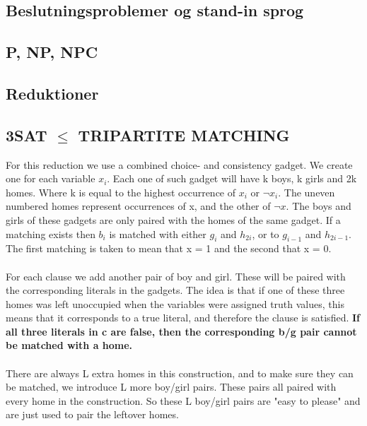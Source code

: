 \subsection{Beslutningsproblemer og stand-in sprog}
\subsection{P, NP, NPC}
\subsection{Reduktioner}
\subsection{3SAT $\le$ TRIPARTITE MATCHING}
For this reduction we use a combined choice- and consistency gadget. We create one for each variable $x_i$. Each one of such gadget will have k boys, k girls and 2k homes. Where k is equal to the highest occurrence of $x_i$ or $\lnot x_i$.
The uneven numbered homes represent occurrences of x, and the other of $\lnot x$. The boys and girls of these gadgets are only paired with the homes of the same gadget. If a matching exists then $b_i$ is matched with either $g_i$ and $h_{2i}$, or to $g_{i-1}$ and $h_{2i-1}$. The first matching is taken to mean that x = 1 and the second that x = 0.
\\\\
For each clause we add another pair of boy and girl. These will be paired with the corresponding literals in the gadgets. The idea is that if one of these three homes was left unoccupied when the variables were assigned truth values, this means that it corresponds to a true literal, and therefore the clause is satisfied. \textbf{If all three literals in c are false, then the corresponding b/g pair cannot be matched with a home.} \\\\
There are always L extra homes in this construction, and to make sure they can be matched, we introduce L more boy/girl pairs. These pairs all paired with every home in the construction. So these L boy/girl pairs are "easy to please" and are just used to pair the leftover homes. \\\\

